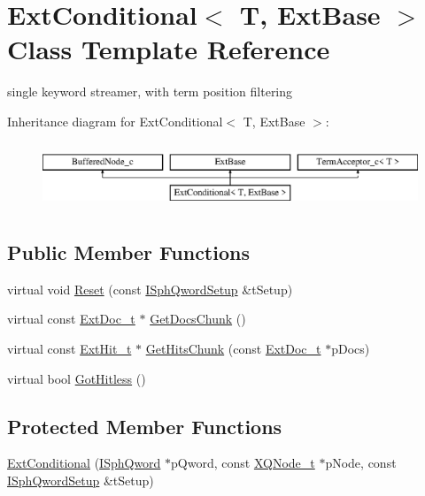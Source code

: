 \hypertarget{classExtConditional}{\section{Ext\-Conditional$<$ T, Ext\-Base $>$ Class Template Reference}
\label{classExtConditional}
}


single keyword streamer, with term position filtering  


Inheritance diagram for Ext\-Conditional$<$ T, Ext\-Base $>$\-:\begin{figure}[H]
\begin{center}
\leavevmode
\includegraphics[height=2.000000cm]{classExtConditional}
\end{center}
\end{figure}
\subsection*{Public Member Functions}
\begin{DoxyCompactItemize}
\item 
virtual void \hyperlink{classExtConditional_ac43b4ab4271edeb1c0b9d87579a005a0}{Reset} (const \hyperlink{classISphQwordSetup}{I\-Sph\-Qword\-Setup} \&t\-Setup)
\item 
virtual const \hyperlink{structExtDoc__t}{Ext\-Doc\-\_\-t} $\ast$ \hyperlink{classExtConditional_a81ab9366dcef98d27598850b938446d5}{Get\-Docs\-Chunk} ()
\item 
virtual const \hyperlink{structExtHit__t}{Ext\-Hit\-\_\-t} $\ast$ \hyperlink{classExtConditional_acb7bc17d9b44a428bf29f50aafcc25a1}{Get\-Hits\-Chunk} (const \hyperlink{structExtDoc__t}{Ext\-Doc\-\_\-t} $\ast$p\-Docs)
\item 
virtual bool \hyperlink{classExtConditional_a462498e5383ae65d4fc81ff53fe15f6e}{Got\-Hitless} ()
\end{DoxyCompactItemize}
\subsection*{Protected Member Functions}
\begin{DoxyCompactItemize}
\item 
\hyperlink{classExtConditional_a2dc87b759134b0d1f576c422129fe000}{Ext\-Conditional} (\hyperlink{classISphQword}{I\-Sph\-Qword} $\ast$p\-Qword, const \hyperlink{structXQNode__t}{X\-Q\-Node\-\_\-t} $\ast$p\-Node, const \hyperlink{classISphQwordSetup}{I\-Sph\-Qword\-Setup} \&t\-Setup)
\end{DoxyCompactItemize}
